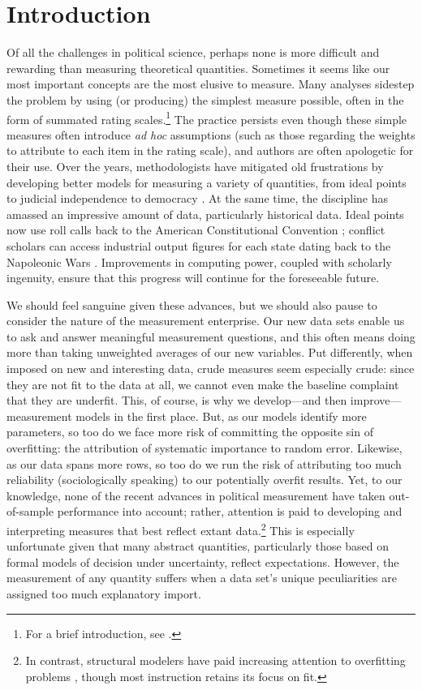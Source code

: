 \section{Introduction}

Of all the challenges in political science, perhaps none is more difficult and rewarding than measuring theoretical quantities.
Sometimes it seems like our most important concepts are the most elusive to measure.
Many analyses sidestep the problem by  using (or producing) the simplest measure possible, often in the form of summated rating scales.\footnote{For a brief introduction, see \citet{spector2006}.}
The practice persists even though these simple measures often introduce \emph{ad hoc} assumptions (such as those regarding the weights to attribute to each item in the rating scale), and authors are often apologetic for their use.
Over the years, methodologists have mitigated old frustrations by developing better models for measuring a variety of quantities, from ideal points \citep{clinton2004} to judicial independence \citep{linzer2014} to democracy \citep{jackman2008}.
At the same time, the discipline has amassed an impressive amount of data, particularly historical data.
Ideal points now use roll calls back to the American Constitutional Convention \citep{heckelman2013}; conflict scholars can access industrial output figures for each state dating back to the Napoleonic Wars \citep{singer1972}.
Improvements in computing power, coupled with scholarly ingenuity, ensure that this progress will continue for the foreseeable future.

We should feel sanguine given these advances, but we should also pause to consider the nature of the measurement enterprise.
Our new data sets enable us to ask and answer meaningful measurement questions, and this often means doing more than taking unweighted averages of our new variables.
Put differently, when imposed on new and interesting data, crude measures seem especially crude:  since they are not fit to the data at all, we cannot even make the baseline complaint that they are underfit.
This, of course, is why we develop---and then improve---measurement models in the first place.
But, as our models identify more parameters, so too do we face more risk of committing the opposite sin of overfitting: the attribution of systematic importance to random error.
Likewise, as our data spans more rows, so too do we run the risk of attributing too much reliability (sociologically speaking) to our potentially overfit results.
Yet, to our knowledge, none of the recent advances in political measurement have taken out-of-sample performance into account; rather, attention is paid to developing and interpreting measures that best reflect extant data.\footnote{In contrast, structural modelers have paid increasing attention to overfitting problems \citep{pitt2002,preacher2006}, though most instruction retains its focus on fit.}
This is especially unfortunate given that many abstract quantities, particularly those based on formal models of decision under uncertainty, reflect expectations.
However, the measurement of any quantity suffers when a data set's unique peculiarities are assigned too much explanatory import.

